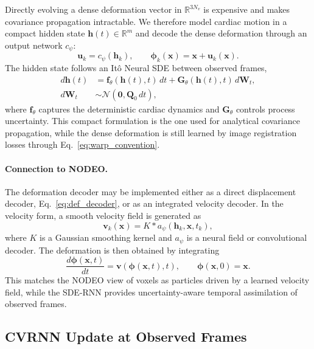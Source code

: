 \documentclass[10pt,twocolumn]{article}
\newcommand{\R}{\mathbb{R}}
\begin{document}
Directly evolving a dense deformation vector in $\R^{3N_v}$ is expensive and makes covariance propagation intractable. We therefore model cardiac motion in a compact hidden state $\bm{h}(t)\in\R^m$ and decode the dense deformation through an output network $c_\psi$:
\begin{equation}
    \bm{u}_k = c_\psi(\bm{h}_k),
    \qquad
    \bm{\phi}_k(\bm{x})=\bm{x}+\bm{u}_k(\bm{x}).
    \label{eq:def_decoder}
\end{equation}
The hidden state follows an It\^{o} Neural SDE between observed frames,
\begin{equation}
\begin{aligned}
    d\bm{h}(t)
    &= \bm{f}_\theta(\bm{h}(t),t)\,dt
    + \bm{G}_\theta(\bm{h}(t),t)\,d\bm{W}_t, \\
    d\bm{W}_t &\sim\mathcal{N}(\bm{0},\bm{Q}_0\,dt),
\end{aligned}
    \label{eq:sde}
\end{equation}
where $\bm{f}_\theta$ captures the deterministic cardiac dynamics and $\bm{G}_\theta$ controls process uncertainty. This compact formulation is the one used for analytical covariance propagation, while the dense deformation is still learned by image registration losses through Eq.~\eqref{eq:warp_convention}.

\paragraph{Connection to NODEO.}
The deformation decoder may be implemented either as a direct displacement decoder, Eq.~\eqref{eq:def_decoder}, or as an integrated velocity decoder. In the velocity form, a smooth velocity field is generated as
\begin{equation}
    \bm{v}_k(\bm{x}) = K \ast a_\psi(\bm{h}_k,\bm{x},t_k),
    \label{eq:velocity_decoder}
\end{equation}
where $K$ is a Gaussian smoothing kernel and $a_\psi$ is a neural field or convolutional decoder. The deformation is then obtained by integrating
\begin{equation}
    \frac{d\bm{\phi}(\bm{x},t)}{dt}=\bm{v}(\bm{\phi}(\bm{x},t),t),
    \qquad
    \bm{\phi}(\bm{x},0)=\bm{x}.
    \label{eq:velocity_flow}
\end{equation}
This matches the NODEO view of voxels as particles driven by a learned velocity field, while the SDE-RNN provides uncertainty-aware temporal assimilation of observed frames.

\subsection{CVRNN Update at Observed Frames}
\label{sec:cvgruu_update_clarified}
\end{document}

